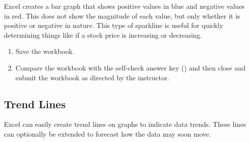 Excel creates a bar graph that shows positive values in blue and negative values in red. This does not show the magnitude of each value, but only whether it is positive or negative in nature. This type of sparkline is useful for quickly determining things like if a stock price is increasing or decreasing.

\begin{enumbox}
	\begin{enumerate}
		\item Save the  workbook.
		\item Compare the workbook with the self-check answer key () and then close and submit the  workbook as directed by the instructor.
	\end{enumerate}
\end{enumbox}
	
\subsection{Trend Lines}

Excel can easily create trend lines on graphs to indicate data trends. These lines can optionally be extended to forecast how the data may soon move.

